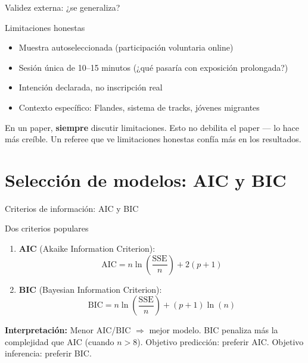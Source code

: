\documentclass[aspectratio=169, 11pt]{beamer}
\begin{document}
\begin{frame}{Validez externa: ¿se generaliza?}
\begin{alertblock}{Limitaciones honestas}
\small
\begin{itemize}\setlength{\itemsep}{3pt}
  \item Muestra autoseleccionada (participación voluntaria online)
  \item Sesión única de 10--15 minutos (¿qué pasaría con exposición prolongada?)
  \item Intención declarada, no inscripción real
  \item Contexto específico: Flandes, sistema de tracks, jóvenes migrantes
\end{itemize}
\end{alertblock}

\vspace{0.3cm}
{\small En un paper, \textbf{siempre} discutir limitaciones. Esto no debilita el paper --- lo hace más creíble. Un referee que ve limitaciones honestas confía más en los resultados.}
\end{frame}

\section{Selección de modelos: AIC y BIC}

\begin{frame}{Criterios de información: AIC y BIC}
\begin{block}{Dos criterios populares}
\begin{enumerate}
  \item \textbf{AIC} (Akaike Information Criterion):
  \[
  \text{AIC} = n \ln\!\left(\frac{\text{SSE}}{n}\right) + 2(p + 1)
  \]

  \item \textbf{BIC} (Bayesian Information Criterion):
  \[
  \text{BIC} = n \ln\!\left(\frac{\text{SSE}}{n}\right) + (p + 1) \ln(n)
  \]
\end{enumerate}
\end{block}

\vspace{0.2cm}
{\small \textbf{Interpretación:} Menor AIC/BIC $\Rightarrow$ mejor modelo. BIC penaliza más la complejidad que AIC (cuando $n > 8$). Objetivo predicción: preferir AIC. Objetivo inferencia: preferir BIC.}
\end{frame}
\end{document}
